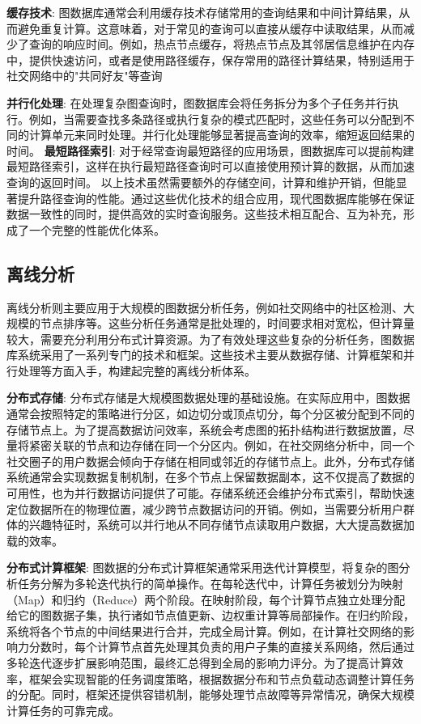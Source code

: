 \textbf{缓存技术}: 图数据库通常会利用缓存技术存储常用的查询结果和中间计算结果，从而避免重复计算。这意味着，对于常见的查询可以直接从缓存中读取结果，从而减少了查询的响应时间。例如，热点节点缓存，将热点节点及其邻居信息维护在内存中，提供快速访问，或者是使用路径缓存，保存常用的路径计算结果，特别适用于社交网络中的"共同好友"等查询


\textbf{并行化处理}: 在处理复杂图查询时，图数据库会将任务拆分为多个子任务并行执行。例如，当需要查找多条路径或执行复杂的模式匹配时，这些任务可以分配到不同的计算单元来同时处理。并行化处理能够显著提高查询的效率，缩短返回结果的时间。
\textbf{最短路径索引}: 对于经常查询最短路径的应用场景，图数据库可以提前构建最短路径索引，这样在执行最短路径查询时可以直接使用预计算的数据，从而加速查询的返回时间。
以上技术虽然需要额外的存储空间，计算和维护开销，但能显著提升路径查询的性能。通过这些优化技术的组合应用，现代图数据库能够在保证数据一致性的同时，提供高效的实时查询服务。这些技术相互配合、互为补充，形成了一个完整的性能优化体系。


\subsection{离线分析}

离线分析则主要应用于大规模的图数据分析任务，例如社交网络中的社区检测、大规模的节点排序等。这些分析任务通常是批处理的，时间要求相对宽松，但计算量较大，需要充分利用分布式计算资源。为了有效处理这些复杂的分析任务，图数据库系统采用了一系列专门的技术和框架。这些技术主要从数据存储、计算框架和并行处理等方面入手，构建起完整的离线分析体系。

\textbf{分布式存储}: 分布式存储是大规模图数据处理的基础设施。在实际应用中，图数据通常会按照特定的策略进行分区，如边切分或顶点切分，每个分区被分配到不同的存储节点上。为了提高数据访问效率，系统会考虑图的拓扑结构进行数据放置，尽量将紧密关联的节点和边存储在同一个分区内。例如，在社交网络分析中，同一个社交圈子的用户数据会倾向于存储在相同或邻近的存储节点上。此外，分布式存储系统通常会实现数据复制机制，在多个节点上保留数据副本，这不仅提高了数据的可用性，也为并行数据访问提供了可能。存储系统还会维护分布式索引，帮助快速定位数据所在的物理位置，减少跨节点数据访问的开销。例如，当需要分析用户群体的兴趣特征时，系统可以并行地从不同存储节点读取用户数据，大大提高数据加载的效率。

\textbf{分布式计算框架}: 图数据的分布式计算框架通常采用迭代计算模型，将复杂的图分析任务分解为多轮迭代执行的简单操作。在每轮迭代中，计算任务被划分为映射（Map）和归约（Reduce）两个阶段。在映射阶段，每个计算节点独立处理分配给它的图数据子集，执行诸如节点值更新、边权重计算等局部操作。在归约阶段，系统将各个节点的中间结果进行合并，完成全局计算。例如，在计算社交网络的影响力分数时，每个计算节点首先处理其负责的用户子集的直接关系网络，然后通过多轮迭代逐步扩展影响范围，最终汇总得到全局的影响力评分。为了提高计算效率，框架会实现智能的任务调度策略，根据数据分布和节点负载动态调整计算任务的分配。同时，框架还提供容错机制，能够处理节点故障等异常情况，确保大规模计算任务的可靠完成。

